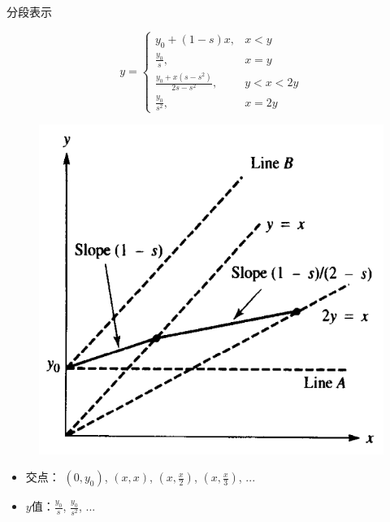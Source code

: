 \documentclass[UTF8]{ctexbeamer}
\begin{document}
\begin{frame}{分段表示}

  \begin{figure}
    \begin{minipage}{.5\linewidth}
      \[
      y =
      \left\{
        \begin{array}{ll}
          y_0 +(1-s)x, & x < y\\
          \frac{y_0}{s}, & x = y\\
          \frac{y_0 + x(s-s^2)}{2s - s^2}, & y < x < 2y\\
          \frac{y_0}{s^2},& x = 2y
        \end{array}
      \right.
      \]
    \end{minipage}%
    \begin{minipage}{.5\linewidth}
      \includegraphics[width=.8\textwidth]{linear.png}
    \end{minipage}
  \end{figure}

  \begin{itemize}
  \item 交点： $(0, y_0)$, $(x, x)$, $(x, \frac{x}{2})$, $(x, \frac{x}{3})$, ...
  \item $y$值：$\frac{y_0}{s}$, $\frac{y_0}{s^2}$, ...
  \end{itemize}

\end{frame}
\end{document}
